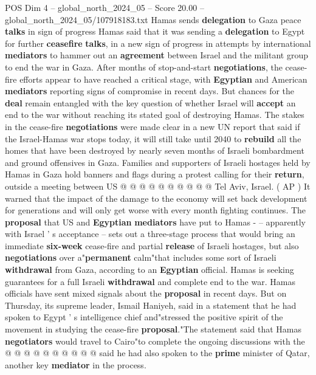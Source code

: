 \begin{textsample}{POS Dim 4 – global\_north\_2024\_05 – Score 20.00 – global\_north\_2024\_05/107918183.txt}  \label{ex:f4_pos_339}
Hamas sends \textbf{delegation} to Gaza peace \textbf{talks} in sign of progress Hamas said that it was sending a \textbf{delegation} to Egypt for further \textbf{ceasefire} \textbf{talks}, in a new sign of progress in attempts by international \textbf{mediators} to hammer out an \textbf{agreement} between Israel and the militant group to end the war in Gaza.
After months of stop-and-start \textbf{negotiations}, the cease-fire efforts appear to have reached a critical stage, with \textbf{Egyptian} and American \textbf{mediators} reporting signs of compromise in recent days.
But chances for the \textbf{deal} remain entangled with the key question of whether Israel will \textbf{accept} an end to the war without reaching its stated goal of destroying Hamas.
The stakes in the cease-fire \textbf{negotiations} were made clear in a new UN report that said if the Israel-Hamas war stops today, it will still take until 2040 to \textbf{rebuild} all the homes that have been destroyed by nearly seven months of Israeli bombardment and ground offensives in Gaza.
Families and supporters of Israeli hostages held by Hamas in Gaza hold banners and flags during a protest calling for their \textbf{return}, outside a meeting between US @ @ @ @ @ @ @ @ @ @ Tel Aviv, Israel. ( AP ) It warned that the impact of the damage to the economy will set back development for generations and will only get worse with every month fighting continues.
The \textbf{proposal} that US and \textbf{Egyptian} \textbf{mediators} have put to Hamas - -- apparently with Israel ' s acceptance -- sets out a three-stage process that would bring an immediate \textbf{six-week} cease-fire and partial \textbf{release} of Israeli hostages, but also \textbf{negotiations} over a"\textbf{permanent} calm"that includes some sort of Israeli \textbf{withdrawal} from Gaza, according to an \textbf{Egyptian} official.
Hamas is seeking guarantees for a full Israeli \textbf{withdrawal} and complete end to the war.
Hamas officials have sent mixed signals about the \textbf{proposal} in recent days.
But on Thursday, its supreme leader, Ismail Haniyeh, said in a statement that he had spoken to Egypt ' s intelligence chief and"stressed the positive spirit of the movement in studying the cease-fire \textbf{proposal}."The statement said that Hamas \textbf{negotiators} would travel to Cairo"to complete the ongoing discussions with the @ @ @ @ @ @ @ @ @ @ said he had also spoken to the \textbf{prime} minister of Qatar, another key \textbf{mediator} in the process.

\end{textsample}

